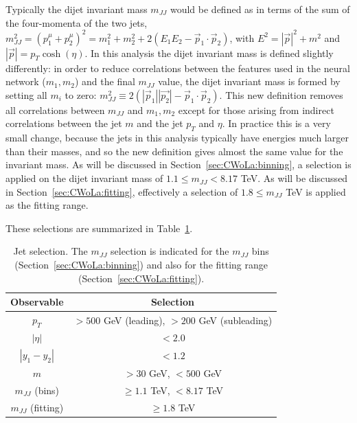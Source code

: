 Typically the dijet invariant mass $m_{JJ}$ would be defined as in terms of the sum of the four-momenta of the two jets, $m_{JJ}^2 = (p^\mu_1+p^\mu_2)^2 = m_1^2+m_2^2+2\left(E_1E_2-\vec{p}_1\cdot\vec{p}_2\right)$, with $E^2 = |\vec{p}|^2+m^2$ and $|\vec{p}| = p_T\cosh(\eta)$.
In this analysis the dijet invariant mass is defined slightly differently: in order to reduce correlations between the features used in the neural network ($m_1,m_2$) and the final $m_{JJ}$ value, the dijet invariant mass is formed by setting all $m_i$ to zero: $m_{JJ}^2 \equiv 2\left(|\vec{p}_1||\vec{p_2}|-\vec{p}_1\cdot\vec{p}_2\right)$.
This new definition removes all correlations between $m_{JJ}$ and $m_1,m_2$ except for those arising from indirect correlations between the jet $m$ and the jet $p_T$ and $\eta$.
In practice this is a very small change, because the jets in this analysis typically have energies much larger than their masses, and so the new definition gives almost the same value for the invariant mass.
As will be discussed in Section~\ref{sec:CWoLa:binning}, a selection is applied on the dijet invariant mass of $1.1 \le m_{JJ} < 8.17$ TeV.
As will be discussed in Section~\ref{sec:CWoLa:fitting}, effectively a selection of $1.8 \le m_{JJ}$ TeV is applied as the fitting range.

These selections are summarized in Table~\ref{tab:event_selection}.
\begin{table}[htbp]
  \begin{center}
    \caption{Jet selection. The $m_{JJ}$ selection is indicated for the $m_{JJ}$ bins (Section~\ref{sec:CWoLa:binning}) and also for the fitting range (Section~\ref{sec:CWoLa:fitting}).}
  \label{tab:event_selection}
    \begin{tabular}{c c}
      \hline
      Observable & Selection \\
      \hline
      $p_T$ & $>500$ GeV (leading), $>200$ GeV (subleading) \\
      $|\eta|$ & $<2.0$ \\
      $|y_1-y_2|$ & $<1.2$ \\
      $m$ & $> 30$ GeV, $<500$ GeV \\
      $m_{JJ}$ (bins) & $\ge 1.1$ TeV, $<8.17$ TeV \\
      $m_{JJ}$ (fitting) & $\ge 1.8$ TeV \\
      \hline
    \end{tabular}
  \end{center}
\end{table}

